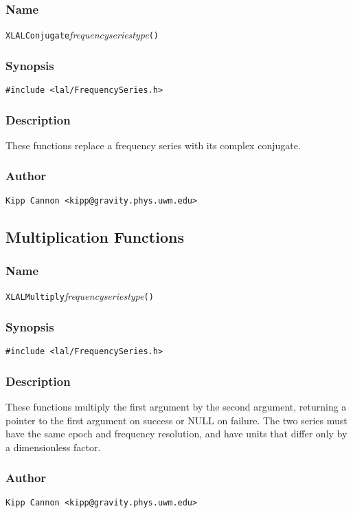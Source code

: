 \subsubsection{Name}

\texttt{XLALConjugate}\textit{frequencyseriestype}\texttt{()}

\subsubsection{Synopsis}

\begin{verbatim}
#include <lal/FrequencySeries.h>
\end{verbatim}


\subsubsection{Description}

These functions replace a frequency series with its complex conjugate.

\subsubsection{Author}

\verb|Kipp Cannon <kipp@gravity.phys.uwm.edu>|


\subsection{Multiplication Functions}

\subsubsection{Name}

\texttt{XLALMultiply}\textit{frequencyseriestype}\texttt{()}

\subsubsection{Synopsis}

\begin{verbatim}
#include <lal/FrequencySeries.h>
\end{verbatim}


\subsubsection{Description}

These functions multiply the first argument by the second argument,
returning a pointer to the first argument on success or NULL on failure.
The two series must have the same epoch and frequency resolution, and have
units that differ only by a dimensionless factor.

\subsubsection{Author}

\verb|Kipp Cannon <kipp@gravity.phys.uwm.edu>|

